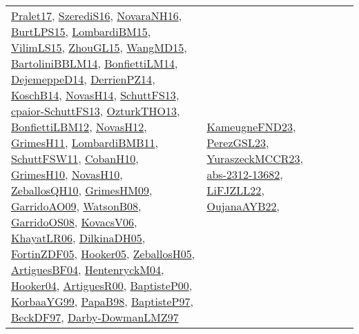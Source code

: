 {\begin{longtable}{lp{3cm}>{\raggedright}p{6cm}>{\raggedright}p{6cm}p{8cm}}
\href{papers/Pralet17.pdf}{Pralet17}\cite{Pralet17}, \href{papers/SzerediS16.pdf}{SzerediS16}\cite{SzerediS16}, \href{articles/NovaraNH16.pdf}{NovaraNH16}\cite{NovaraNH16}, \href{papers/BurtLPS15.pdf}{BurtLPS15}\cite{BurtLPS15}, \href{papers/LombardiBM15.pdf}{LombardiBM15}\cite{LombardiBM15}, \href{papers/VilimLS15.pdf}{VilimLS15}\cite{VilimLS15}, \href{papers/ZhouGL15.pdf}{ZhouGL15}\cite{ZhouGL15}, \href{articles/WangMD15.pdf}{WangMD15}\cite{WangMD15}, \href{papers/BartoliniBBLM14.pdf}{BartoliniBBLM14}\cite{BartoliniBBLM14}, \href{papers/BonfiettiLM14.pdf}{BonfiettiLM14}\cite{BonfiettiLM14}, \href{papers/DejemeppeD14.pdf}{DejemeppeD14}\cite{DejemeppeD14}, \href{papers/DerrienPZ14.pdf}{DerrienPZ14}\cite{DerrienPZ14}, \href{papers/KoschB14.pdf}{KoschB14}\cite{KoschB14}, \href{articles/NovasH14.pdf}{NovasH14}\cite{NovasH14}, \href{papers/SchuttFS13.pdf}{SchuttFS13}\cite{SchuttFS13}, \href{papers/cpaior-SchuttFS13.pdf}{cpaior-SchuttFS13}\cite{cpaior-SchuttFS13}, \href{articles/OzturkTHO13.pdf}{OzturkTHO13}\cite{OzturkTHO13}, \href{papers/BonfiettiLBM12.pdf}{BonfiettiLBM12}\cite{BonfiettiLBM12}, \href{articles/NovasH12.pdf}{NovasH12}\cite{NovasH12}, \href{papers/GrimesH11.pdf}{GrimesH11}\cite{GrimesH11}, \href{papers/LombardiBMB11.pdf}{LombardiBMB11}\cite{LombardiBMB11}, \href{articles/SchuttFSW11.pdf}{SchuttFSW11}\cite{SchuttFSW11}, \href{papers/CobanH10.pdf}{CobanH10}\cite{CobanH10}, \href{papers/GrimesH10.pdf}{GrimesH10}\cite{GrimesH10}, \href{articles/NovasH10.pdf}{NovasH10}\cite{NovasH10}, \href{articles/ZeballosQH10.pdf}{ZeballosQH10}\cite{ZeballosQH10}, \href{papers/GrimesHM09.pdf}{GrimesHM09}\cite{GrimesHM09}, \href{articles/GarridoAO09.pdf}{GarridoAO09}\cite{GarridoAO09}, \href{papers/WatsonB08.pdf}{WatsonB08}\cite{WatsonB08}, \href{articles/GarridoOS08.pdf}{GarridoOS08}\cite{GarridoOS08}, \href{papers/KovacsV06.pdf}{KovacsV06}\cite{KovacsV06}, \href{articles/KhayatLR06.pdf}{KhayatLR06}\cite{KhayatLR06}, \href{papers/DilkinaDH05.pdf}{DilkinaDH05}\cite{DilkinaDH05}, \href{papers/FortinZDF05.pdf}{FortinZDF05}\cite{FortinZDF05}, \href{articles/Hooker05.pdf}{Hooker05}\cite{Hooker05}, \href{articles/ZeballosH05.pdf}{ZeballosH05}\cite{ZeballosH05}, \href{papers/ArtiguesBF04.pdf}{ArtiguesBF04}\cite{ArtiguesBF04}, \href{papers/HentenryckM04.pdf}{HentenryckM04}\cite{HentenryckM04}, \href{papers/Hooker04.pdf}{Hooker04}\cite{Hooker04}, \href{articles/ArtiguesR00.pdf}{ArtiguesR00}\cite{ArtiguesR00}, \href{articles/BaptisteP00.pdf}{BaptisteP00}\cite{BaptisteP00}, \href{papers/KorbaaYG99.pdf}{KorbaaYG99}\cite{KorbaaYG99}, \href{articles/PapaB98.pdf}{PapaB98}\cite{PapaB98}, \href{papers/BaptisteP97.pdf}{BaptisteP97}\cite{BaptisteP97}, \href{papers/BeckDF97.pdf}{BeckDF97}\cite{BeckDF97}, \href{articles/Darby-DowmanLMZ97.pdf}{Darby-DowmanLMZ97}\cite{Darby-DowmanLMZ97} & \href{papers/KameugneFND23.pdf}{KameugneFND23}\cite{KameugneFND23}, \href{papers/PerezGSL23.pdf}{PerezGSL23}\cite{PerezGSL23}, \href{articles/YuraszeckMCCR23.pdf}{YuraszeckMCCR23}\cite{YuraszeckMCCR23}, \href{articles/abs-2312-13682.pdf}{abs-2312-13682}\cite{abs-2312-13682}, \href{papers/LiFJZLL22.pdf}{LiFJZLL22}\cite{LiFJZLL22}, \href{papers/OujanaAYB22.pdf}{OujanaAYB22}\cite{OujanaAYB22}, 
\end{longtable}}
